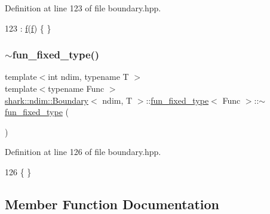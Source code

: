 Definition at line 123 of file boundary.\+hpp.


\begin{DoxyCode}
123 : \hyperlink{classshark_1_1ndim_1_1_boundary_1_1fun__fixed__type_a968985106f368116b458500c16c4476f}{f}(\hyperlink{classshark_1_1ndim_1_1_boundary_1_1fun__fixed__type_a968985106f368116b458500c16c4476f}{f}) \{ \}
\end{DoxyCode}
\hypertarget{classshark_1_1ndim_1_1_boundary_1_1fun__fixed__type_ae72b49516804b9d47bdc29917d7249bf}{}\label{classshark_1_1ndim_1_1_boundary_1_1fun__fixed__type_ae72b49516804b9d47bdc29917d7249bf} 
\subsubsection{\texorpdfstring{$\sim$fun\+\_\+fixed\+\_\+type()}{~fun\_fixed\_type()}}
{\footnotesize\ttfamily template$<$int ndim, typename T $>$ \\
template$<$typename Func $>$ \\
\hyperlink{classshark_1_1ndim_1_1_boundary}{shark\+::ndim\+::\+Boundary}$<$ ndim, T $>$\+::\hyperlink{classshark_1_1ndim_1_1_boundary_1_1fun__fixed__type}{fun\+\_\+fixed\+\_\+type}$<$ Func $>$\+::$\sim$\hyperlink{classshark_1_1ndim_1_1_boundary_1_1fun__fixed__type}{fun\+\_\+fixed\+\_\+type} (\begin{DoxyParamCaption}{ }\end{DoxyParamCaption})\hspace{0.3cm}{\ttfamily [virtual]}}



Definition at line 126 of file boundary.\+hpp.


\begin{DoxyCode}
126 \{ \}
\end{DoxyCode}


\subsection{Member Function Documentation}
\hypertarget{classshark_1_1ndim_1_1_boundary_1_1fun__fixed__type_a54ad8e702f2f3ff9403d43bfb7b38411}{}\label{classshark_1_1ndim_1_1_boundary_1_1fun__fixed__type_a54ad8e702f2f3ff9403d43bfb7b38411} 
